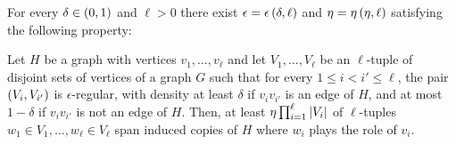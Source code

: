      \label{lem:H_like_partition_implies_H_abundance}
        For every $\delta \in \left( 0, 1 \right)$ and $\ell > 0$ there exist $\epsilon = \epsilon \left( \delta, \ell \right)$ and
        $\eta = \eta \left( \eta, \ell \right)$ satisfying the following property:

        Let $H$ be a graph with vertices $v_1, \dots,v_\ell$ and let $V_1, \dots, V_\ell$ be an $\ell$-tuple of disjoint
        sets of vertices of a graph $G$ such that for every $1 \leq i < i' \leq \ell$, the pair $\left( V_i, V_{i'} \right)$
        is $\epsilon$-regular, with density at least $\delta$ if $v_i v_{i'}$ is an edge of $H$, and at most $1 - \delta$
        if $v_i v_{i'}$ is not an edge of $H$.
        Then, at least $\eta \prod_{i=1}^\ell \left| V_i \right|$ of $\ell$-tuples $w_1 \in V_1, \dots, w_\ell \in V_\ell$
        span induced copies of $H$ where $w_i$ plays the role of $v_i$.


